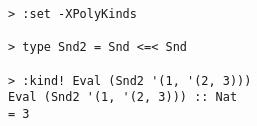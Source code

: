 \begin{repl}\begin{lstlisting}
> :set -XPolyKinds

> type Snd2 = Snd <=< Snd

> :kind! Eval (Snd2 '(1, '(2, 3)))
Eval (Snd2 '(1, '(2, 3))) :: Nat
= 3\end{lstlisting}\end{repl}
